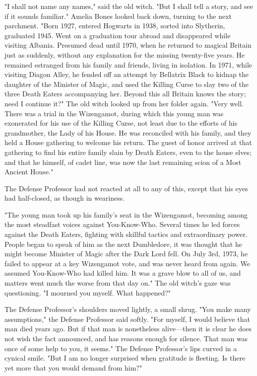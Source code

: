 "I shall not name any names," said the old witch. "But I shall tell a story,
and see if it sounds familiar." Amelia Bones looked back down, turning to the
next parchment. "Born 1927, entered Hogwarts in 1938, sorted into Slytherin,
graduated 1945. Went on a graduation tour abroad and disappeared while visiting
Albania. Presumed dead until 1970, when he returned to magical Britain just as
suddenly, without any explanation for the missing twenty-five years. He
remained estranged from his family and friends, living in isolation. In 1971,
while visiting Diagon Alley, he fended off an attempt by Bellatrix Black to
kidnap the daughter of the Minister of Magic, and used the Killing Curse to
slay two of the three Death Eaters accompanying her. Beyond this all Britain
knows the story; need I continue it?" The old witch looked up from her folder
again. "Very well. There was a trial in the Wizengamot, during which this young
man was exonerated for his use of the Killing Curse, not least due to the
efforts of his grandmother, the Lady of his House. He was reconciled with his
family, and they held a House gathering to welcome his return. The guest of
honor arrived at that gathering to find his entire family slain by Death
Eaters, even to the house elves; and that he himself, of cadet line, was now
the last remaining scion of a Most Ancient House."

The Defense Professor had not reacted at all to any of this, except that his
eyes had half-closed, as though in weariness.

"The young man took up his family's seat in the Wizengamot, becoming among the
most steadfast voices against You-Know-Who. Several times he led forces against
the Death Eaters, fighting with skillful tactics and extraordinary power.
People began to speak of him as the next Dumbledore, it was thought that he
might become Minister of Magic after the Dark Lord fell. On July 3rd,
1973, he failed to appear at a key Wizengamot vote, and was never heard from
again. We assumed You-Know-Who had killed him. It was a grave blow to all of
us, and matters went much the worse from that day on." The old witch's gaze was
questioning. "I mourned you myself. What happened?"

The Defense Professor's shoulders moved lightly, a small shrug. "You make many
assumptions," the Defense Professor said softly. "For myself, I would believe
that man died years ago. But if that man is nonetheless alive---then it is
clear he does not wish the fact announced, and has reasons enough for silence.
That man was once of some help to you, it seems." The Defense Professor's lips
curved in a cynical smile. "But I am no longer surprised when gratitude is
fleeting. Is there yet more that you would demand from him?"

